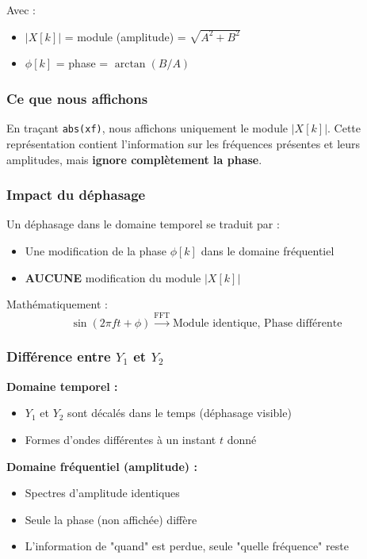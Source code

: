 \documentclass[12pt,a4paper]{article}
\begin{document}
Avec :
\begin{itemize}
    \item $|X[k]|$ = module (amplitude) = $\sqrt{A^2 + B^2}$
    \item $\phi[k]$ = phase = $\arctan(B/A)$
\end{itemize}

\subsubsection{Ce que nous affichons}

En traçant \texttt{abs(xf)}, nous affichons uniquement le module $|X[k]|$. Cette représentation contient l'information sur les fréquences présentes et leurs amplitudes, mais \textbf{ignore complètement la phase}.

\subsubsection{Impact du déphasage}

Un déphasage dans le domaine temporel se traduit par :
\begin{itemize}
    \item Une modification de la phase $\phi[k]$ dans le domaine fréquentiel
    \item \textbf{AUCUNE} modification du module $|X[k]|$
\end{itemize}

Mathématiquement :
\begin{equation}
    \sin(2\pi f t + \phi) \xrightarrow{\text{FFT}} \text{Module identique, Phase différente}
\end{equation}

\subsubsection{Différence entre $Y_1$ et $Y_2$}

\textbf{Domaine temporel :}
\begin{itemize}
    \item $Y_1$ et $Y_2$ sont décalés dans le temps (déphasage visible)
    \item Formes d'ondes différentes à un instant $t$ donné
\end{itemize}

\textbf{Domaine fréquentiel (amplitude) :}
\begin{itemize}
    \item Spectres d'amplitude identiques
    \item Seule la phase (non affichée) diffère
    \item L'information de "quand" est perdue, seule "quelle fréquence" reste
\end{itemize}
\end{document}
